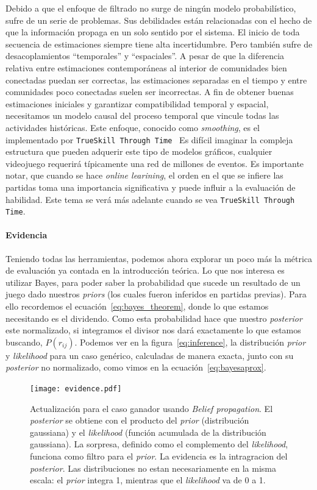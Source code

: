 \documentclass[11pt,twoside,spanish]{report} %
\begin{document}
 Debido a que el enfoque de filtrado no surge de ningún modelo probabil\'istico, sufre de un serie de problemas.
 Sus debilidades están relacionadas con el hecho de que la informaci\'on propaga en un solo sentido por el sistema.
 El inicio de toda secuencia de estimaciones siempre tiene alta incertidumbre.
 Pero también sufre de desacoplamientos ``temporales'' y ``espaciales''.
 A pesar de que la diferencia relativa entre estimaciones contempor\'aneas al interior de comunidades bien conectadas puedan ser correctas, las estimaciones separadas en el tiempo y entre comunidades poco conectadas suelen ser incorrectas.
 A fin de obtener buenas estimaciones iniciales y garantizar compatibilidad temporal y espacial, necesitamos un modelo causal del proceso temporal que vincule todas las actividades hist\'oricas.
 Este enfoque, conocido como \emph{smoothing}, es el implementado por \texttt{TrueSkill Through Time}~\cite{Dangauthier2007}
 Es dif\'icil imaginar la compleja estructura que pueden adquerir este tipo de modelos gr\'aficos, cualquier videojuego requerirá t\'ipicamente una red de millones de eventos.
Es importante notar, que cuando se hace \textit{online learining}, el orden en el que se infiere las partidas toma una importancia significativa y  puede influir a la evaluaci\'on de habilidad.
Este tema se ver\'a m\'as adelante cuando se vea \texttt{TrueSkill Through Time}.


\paragraph{Evidencia}
Teniendo todas las herramientas, podemos ahora explorar un poco m\'as la m\'etrica de evaluaci\'on ya contada en la introducci\'on te\'orica.
Lo que nos interesa es utilizar Bayes, para poder saber la probabilidad que sucede un resultado de un juego dado nuestros \textit{priors} (los cuales fueron inferidos en partidas previas).
Para ello recordemos el ecuaci\'on~\ref{eq:bayes_theorem}, donde lo que estamos necesitando es el dividendo.
Como esta probabilidad hace que nuestro \textit{posterior} este normalizado, si integramos el divisor nos dar\'a exactamente lo que estamos buscando, $P(r_{ij})$.
Podemos ver en la figura~\ref{eq:inference}, la distribuci\'on \textit{prior} y \textit{likelihood} para un caso gen\'erico, calculadas de manera exacta, junto con su \textit{posterior} no normalizado, como vimos en la ecuaci\'on~\ref{eq:bayesaprox}.


\begin{figure}[H]
	\centering
	\texttt{[image: evidence.pdf]}
	\caption{Actualizaci\'on para el caso ganador usando \textit{Belief propagation}. El \textit{posterior} se obtiene con el producto del \textit{prior} (distribuci\'on gaussiana) y el \textit{likelihood} (funci\'on acumulada de la distribuci\'on gaussiana). La sorpresa, definido como el complemento del \textit{likelihood}, funciona como filtro para el \textit{prior}. La evidencia es la intragracion del \textit{posterior}. Las distribuciones no estan necesariamente en la misma escala: el \textit{prior} integra 1, mientras que el \textit{likelihood} va de 0 a 1.}
	\label{fig:evidencia}
\end{figure}
\end{document}
